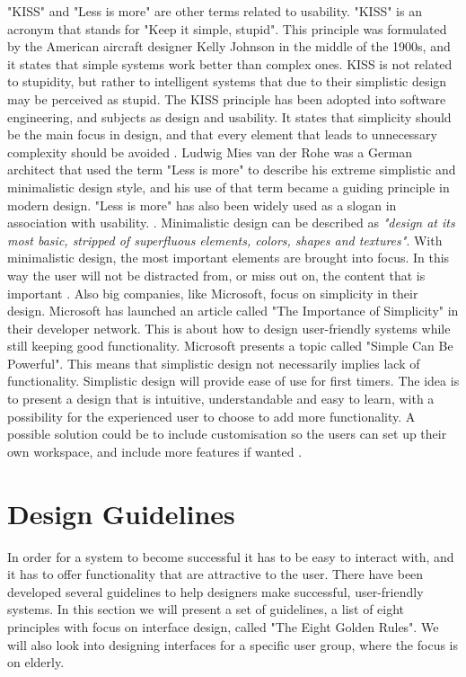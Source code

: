 "KISS" and "Less is more" are other terms related to usability. "KISS" is an acronym that stands for "Keep it simple, stupid". This principle was formulated by the American aircraft designer Kelly Johnson in the middle of the 1900s, and it states that simple systems work better than complex ones. KISS is not related to stupidity, but rather to intelligent systems that due to their simplistic design may be perceived as stupid. The KISS principle has been adopted into software engineering, and subjects as design and usability. It states that simplicity should be the main focus in design, and that every element that leads to unnecessary complexity should be avoided \cite{kiss1} \cite{kiss2}. Ludwig Mies van der Rohe was a German architect that used the term "Less is more" to describe his extreme simplistic and minimalistic design style, and his use of that term became a guiding principle in modern design. "Less is more" has also been widely used as a slogan in association with usability. \cite{rohe}. Minimalistic design can be described as \emph{"design at its most basic, stripped of superfluous elements, colors, shapes and textures"}. With minimalistic design, the most important elements are brought into focus. In this way the user will not be distracted from, or miss out on, the content that is important \cite{lessismore}. Also big companies, like Microsoft, focus on simplicity in their design. Microsoft has launched an article called "The Importance of Simplicity" in their developer network. This is about how to design user-friendly systems while still keeping good functionality. Microsoft presents a topic called "Simple Can Be Powerful". This means that simplistic design not necessarily implies lack of functionality. Simplistic design will provide ease of use for first timers. The idea is to present a design that is intuitive, understandable and easy to learn, with a possibility for the experienced user to choose to add more functionality. A possible solution could be to include customisation so the users can set up their own workspace, and include more features if wanted \cite{msdnsimple}.            
    
\section{Design Guidelines}
\label{sec:designguide}
In order for a system to become successful it has to be easy to interact with, and it has to offer functionality that are attractive to the user. There have been developed several guidelines to help designers make successful, user-friendly systems. In this section we will present a set of guidelines, a list of eight principles with focus on interface design, called "The Eight Golden Rules". We will also look into designing interfaces for a specific user group, where the focus is on elderly. 

